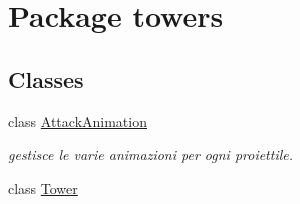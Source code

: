 \hypertarget{namespacetowers}{}\section{Package towers}
\label{namespacetowers}
\subsection*{Classes}
\begin{DoxyCompactItemize}
\item 
class \hyperlink{classtowers_1_1_attack_animation}{Attack\+Animation}
\begin{DoxyCompactList}\small\item\em gestisce le varie animazioni per ogni proiettile. \end{DoxyCompactList}\item 
class \hyperlink{classtowers_1_1_tower}{Tower}
\end{DoxyCompactItemize}
